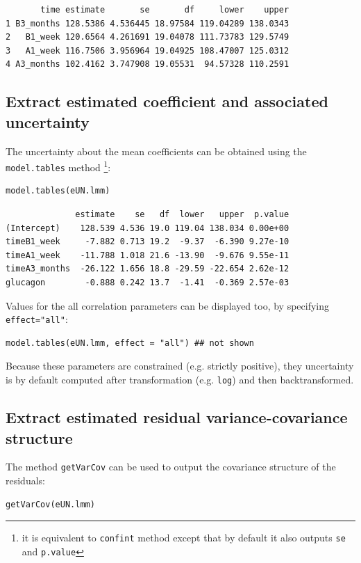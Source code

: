 \documentclass[12pt]{article}
\begin{document}
\begin{verbatim}
       time estimate       se       df     lower    upper
1 B3_months 128.5386 4.536445 18.97584 119.04289 138.0343
2   B1_week 120.6564 4.261691 19.04078 111.73783 129.5749
3   A1_week 116.7506 3.956964 19.04925 108.47007 125.0312
4 A3_months 102.4162 3.747908 19.05531  94.57328 110.2591
\end{verbatim}

\subsection{Extract estimated coefficient and associated uncertainty}
\label{sec:org8015941}

The uncertainty about the mean coefficients can be obtained using the
\texttt{model.tables} method \footnote{it is equivalent to \texttt{confint} method
except that by default it also outputs \texttt{se} and \texttt{p.value}}:
\lstset{language=r,label= ,caption= ,captionpos=b,numbers=none}
\begin{lstlisting}
model.tables(eUN.lmm)
\end{lstlisting}

\begin{verbatim}
              estimate    se   df  lower   upper  p.value
(Intercept)    128.539 4.536 19.0 119.04 138.034 0.00e+00
timeB1_week     -7.882 0.713 19.2  -9.37  -6.390 9.27e-10
timeA1_week    -11.788 1.018 21.6 -13.90  -9.676 9.55e-11
timeA3_months  -26.122 1.656 18.8 -29.59 -22.654 2.62e-12
glucagon        -0.888 0.242 13.7  -1.41  -0.369 2.57e-03
\end{verbatim}


Values for the all correlation parameters can be displayed
too, by specifying \texttt{effect="all"}:
\lstset{language=r,label= ,caption= ,captionpos=b,numbers=none}
\begin{lstlisting}
model.tables(eUN.lmm, effect = "all") ## not shown
\end{lstlisting}

Because these parameters are constrained (e.g. strictly positive),
they uncertainty is by default computed after transformation
(e.g. \texttt{log}) and then backtransformed. 

\subsection{Extract estimated residual variance-covariance structure}
\label{sec:org3fd68aa}

The method \texttt{getVarCov} can be used to output the covariance structure of the residuals:
\lstset{language=r,label= ,caption= ,captionpos=b,numbers=none}
\begin{lstlisting}
getVarCov(eUN.lmm)
\end{lstlisting}
\end{document}
